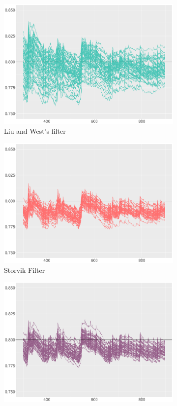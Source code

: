 \begin{figure}[h!]
\centering
  \begin{subfigure}[t]{0.46\textwidth}
\includegraphics[width=\textwidth]{Chapters/04Filtering/plot/LWchain100.pdf}
\caption{Liu and West's filter}
  \end{subfigure}
  \begin{subfigure}[t]{0.46\textwidth}
\includegraphics[width=\textwidth]{Chapters/04Filtering/plot/STchain100.pdf}
\caption{Storvik Filter}
  \end{subfigure}
  \begin{subfigure}[t]{0.46\textwidth}
\includegraphics[width=\textwidth]{Chapters/04Filtering/plot/PLchain100.pdf}

\end{subfigure}
\end{figure}

